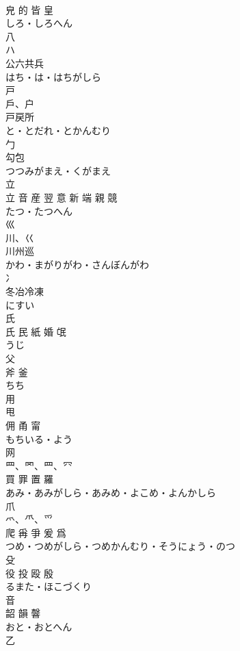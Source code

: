 \documentclass[8pt]{extreport}
\begin{document}
\begin{CJK}{UTF8}{min}
\\	皃 的 皆 皇	
\\	しろ・しろへん	
\\	八	
\\	ハ 
\\	公六共兵	
\\	はち・は・はちがしら	
\\	戸	
\\	戶、户 
\\	戸戻所	
\\	と・とだれ・とかんむり	
\\	勹	
\\	勾包	
\\	つつみがまえ・くがまえ	
\\	立	
\\	立 音 産 翌 意 新 端 親 競	
\\	たつ・たつへん	
\\	巛	
\\	川、巜 
\\	川州巡	
\\	かわ・まがりがわ・さんぼんがわ	
\\	冫	
\\	冬冶冷凍	
\\	にすい	
\\	氏	
\\	氏 民 紙 婚 氓	
\\	うじ	
\\	父	
\\	斧 釜	
\\	ちち	
\\	用	
\\	甩 
\\	佣 甬 甯	
\\	もちいる・よう	
\\	网	
\\	罒、罓、⺲、⺳ 
\\	買 罪 置 羅	
\\	あみ・あみがしら・あみめ・よこめ・よんかしら	
\\	爪	
\\	爫、⺥、⺤ 
\\	爬 爯 爭 爰 爲	
\\	つめ・つめがしら・つめかんむり・そうにょう・のつ	
\\	殳	
\\	役 投 殴 殷	
\\	るまた・ほこづくり	
\\	音	
\\	韶 韻 韾	
\\	おと・おとへん	
\\	乙	

\end{CJK}
\end{document}
